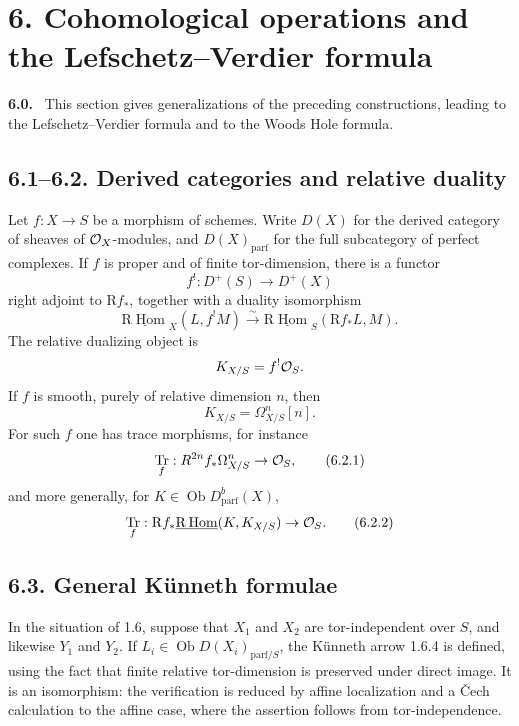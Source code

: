 \documentclass[11pt]{article}
\theoremstyle{plain}
\theoremstyle{definition}
\theoremstyle{remark}
\newenvironment{statement}[1]{\par\medskip\noindent\textbf{#1.}\ }{\par\medskip}
\DeclareMathOperator{\Hom}{Hom}
\DeclareMathOperator{\ob}{Ob}
\DeclareMathOperator{\Tr}{Tr}
\newcommand{\R}{\mathrm R}
\begin{document}
\section*{6. Cohomological operations and the Lefschetz--Verdier formula}

\begin{statement}{6.0}
This section gives generalizations of the preceding constructions, leading to the Lefschetz--Verdier formula and to the Woods Hole formula.
\end{statement}

\subsection*{6.1--6.2. Derived categories and relative duality}
Let $f:X\to S$ be a morphism of schemes. Write $D(X)$ for the derived category of sheaves of $\mathcal O_X$-modules, and $D(X)_{\mathrm{parf}}$ for the full subcategory of perfect complexes. If $f$ is proper and of finite tor-dimension, there is a functor
\begin{equation}
   f^!:D^{+}(S)\to D^{+}(X)
   \tag{6.1.1}
\end{equation}
right adjoint to $\R f_*$, together with a duality isomorphism
\begin{equation}
   \underline{\R\Hom}_X(L,f^!M)
      \xrightarrow{\sim}
   \underline{\R\Hom}_S(\R f_*L,M).
   \tag{6.1.2}
\end{equation}
The relative dualizing object is
\[
   K_{X/S}=f^!\mathcal O_S.
\]
If $f$ is smooth, purely of relative dimension $n$, then
\[
   K_{X/S}=\Omega^n_{X/S}[n].
\]
For such $f$ one has trace morphisms, for instance
\begin{equation}
   \Tr_f:R^{2n}f_*\Omega^n_{X/S}\to \cO_S,
   \tag{6.2.1}
\end{equation}
and more generally, for $K\in\ob D^b_{\mathrm{parf}}(X)$,
\begin{equation}
   \Tr_f:
   \R f_*\underline{\R\Hom}(K,K_{X/S})\to \cO_S.
   \tag{6.2.2}
\end{equation}

\subsection*{6.3. General Künneth formulae}
In the situation of 1.6, suppose that $X_1$ and $X_2$ are tor-independent over $S$, and likewise $Y_1$ and $Y_2$. If $L_i\in\ob D(X_i)_{\mathrm{parf}/S}$, the Künneth arrow 1.6.4 is defined, using the fact that finite relative tor-dimension is preserved under direct image. It is an isomorphism: the verification is reduced by affine localization and a Čech calculation to the affine case, where the assertion follows from tor-independence.
\end{document}
